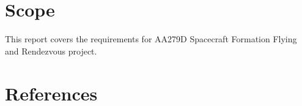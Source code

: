 \documentclass[11pt,letterpaper]{article}
\begin{document}
\newpage
\tableofcontents

\newpage
\listoffigures

\newpage
\listoftables

\newpage
\section{Scope}
This report covers the requirements for AA279D Spacecraft Formation Flying and Rendezvous project.


\newpage


\newpage
\section{References}
\printbibliography[heading=none]

\newpage

\end{document}
